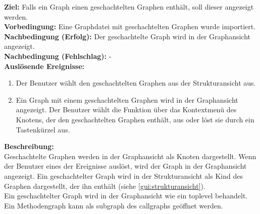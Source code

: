 \label{fa:hierarchgraph}
\textbf{Ziel:} Falls ein Graph einen geschachtelten Graphen enthält, soll dieser angezeigt werden.\\
\textbf{Vorbedingung:} Eine Graphdatei mit geschachtelten Graphen wurde importiert.\\
\textbf{Nachbedingung (Erfolg):} Der geschachtelte Graph wird in der Graphansicht angezeigt.\\
\textbf{Nachbedingung (Fehlschlag):} -\\
\textbf{Auslösende Ereignisse:}
\begin{enumerate}[nolistsep, label=(\alph*)]
  \item Der Benutzer wählt den geschachtelten Graphen aus der Strukturansicht aus.
  \item Ein Graph mit einem geschachtelten Graphen wird in der Graphansicht angezeigt.
  Der Benutzer wählt die Funktion über das Kontextmenü des Knotens, der den geschachtelten Graphen enthält, aus oder löst sie durch ein Tastenkürzel aus.
\end{enumerate}
\textbf{Beschreibung:}\\
Geschachtelte Graphen werden in der Graphansicht als Knoten dargestellt.
Wenn der Benutzer eines der Ereignisse auslöst, wird der Graph in der Graphansicht angezeigt.
Ein geschachtelter Graph wird in der Strukturansicht als Kind des Graphen dargestellt, der ihn enthält (siehe \ref{gui:strukturansicht}).\\
Ein geschachtelter Graph wird in der Graphansicht wie ein \gls{toplevel} behandelt.
Ein Methodengraph kann als \gls{subgraph} des \glspl{callgraph} geöffnet werden.


